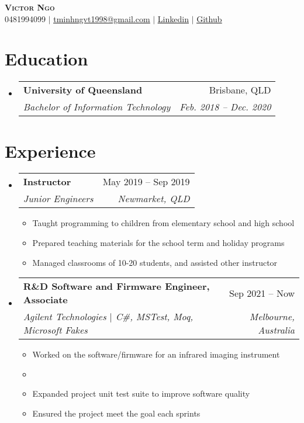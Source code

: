 \documentclass[letterpaper,11pt]{article}
\makeatletter
\newcommand{\resumeItem}[1]{
  \item\small{
    {#1 \vspace{-2pt}}
  }
}
\newcommand{\resumeSubheading}[4]{
  \vspace{-2pt}\item
    \begin{tabular*}{0.97\textwidth}[t]{l@{\extracolsep{\fill}}r}
      \textbf{#1} & #2 \\
      \textit{\small#3} & \textit{\small #4} \\
    \end{tabular*}\vspace{-7pt}
}
\newcommand{\resumeSubHeadingListStart}{\begin{itemize}[leftmargin=0.15in, label={}]}
\newcommand{\resumeSubHeadingListEnd}{\end{itemize}}
\newcommand{\resumeItemListStart}{\begin{itemize}}
\newcommand{\resumeItemListEnd}{\end{itemize}\vspace{-5pt}}
\makeatother
\begin{document}
\begin{center}
    \textbf{\Huge \scshape Victor Ngo} \\ \vspace{1pt}
    \small 0481994099 $|$ \href{mailto:tminhngvt1998@gmail.com}{\underline{tminhngvt1998@gmail.com}} $|$ 
    \href{https://linkedin.com/in/victor-ngo-768366147/}{\underline{Linkedin}} $|$
    \href{https://github.com/BrainIs404}{\underline{Github}}
\end{center}


\section{Education}
  \resumeSubHeadingListStart
    \resumeSubheading
      {University of Queensland}{Brisbane, QLD}
      {Bachelor of Information Technology}{Feb. 2018 -- Dec. 2020}
  \resumeSubHeadingListEnd


\section{Experience}
  \resumeSubHeadingListStart

    \resumeSubheading
      {Instructor}{May 2019 -- Sep 2019}
      {Junior Engineers}{Newmarket, QLD}
      \resumeItemListStart
        \resumeItem{Taught programming to children from elementary school and high school}
        \resumeItem{Prepared teaching materials for the school term and holiday programs}
        \resumeItem{Managed classrooms of 10-20 students, and assisted other instructor}
      \resumeItemListEnd

	\resumeSubheading
       {R\&D Software and Firmware Engineer, Associate}{Sep 2021 -- Now}
       {Agilent Technologies $|$ \emph{C\#, MSTest, Moq, Microsoft Fakes}}{Melbourne, Australia}
      \resumeItemListStart
		  \resumeItem{Worked on the software/firmware for an infrared imaging instrument}
      \resumeItem{}
      \resumeItem{Expanded project unit test suite to improve software quality}
		  \resumeItem{Ensured the project meet the goal each sprints}
    \resumeItemListEnd

\resumeSubHeadingListEnd

\end{document}
